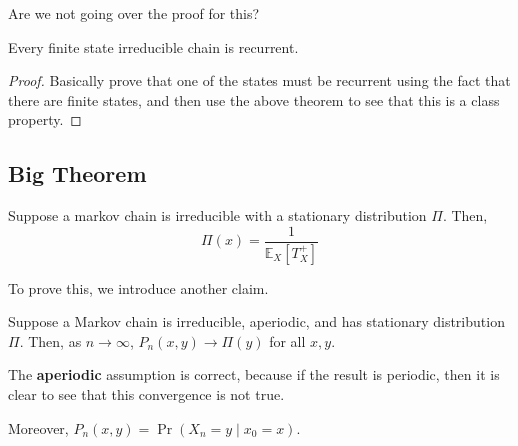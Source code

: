 \documentclass{article}
\newcommand{\EE}{\mathbb{E}}
\begin{document}
Are we not going over the proof for this?

\begin{proposition}
	Every finite state irreducible chain is recurrent.
\end{proposition}

\begin{proof}
	Basically prove that one of the states must be recurrent using the fact that there are finite states, and then use the above theorem to see that this is a class property.
\end{proof}

\subsection{Big Theorem}
\begin{theorem} 
	Suppose a markov chain is irreducible with a stationary distribution $\Pi$. Then, 
	\[\Pi(x) = \frac{1}{\EE_X[T_X^+]}\] 
\end{theorem}

To prove this, we introduce another claim.

\begin{theorem} 
	Suppose a Markov chain is irreducible, aperiodic, and has stationary distribution $\Pi$. Then, as $n \to \infty$, $P_n(x, y) \to \Pi(y)$ for all $x, y$.
\end{theorem}

The \textbf{aperiodic} assumption is correct, because if the result is periodic, then it is clear to see that this convergence is not true. 

Moreover, $P_n(x, y) = \Pr(X_n = y \mid x_0 = x)$.
\end{document}
